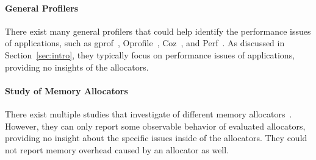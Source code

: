 \paragraph{General Profilers} There exist many general profilers that could help identify the performance issues of applications, such as  gprof~\cite{DBLP:conf/sigplan/GrahamKM82}, Oprofile~\cite{levon2004oprofile}, Coz~\cite{Coz}, and Perf~\cite{perf}. 
As discussed in Section~\ref{sec:intro}, they typically focus on performance issues of applications, providing no insights of the allocators. 

\paragraph{Study of Memory Allocators} There exist multiple studies that investigate of different memory allocators~\cite{Barroso:1998:MSC:279358.279363, 1291361, 6084042, ferreira2011comparison,  zavrtanikexperimental}.
However, they can only report some observable behavior of evaluated allocators, providing no insight about the specific issues inside of the allocators. They could not report memory overhead caused by an allocator as well. 







